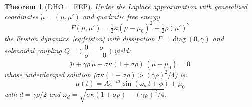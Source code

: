 \documentclass[11pt,a4paper]{article}
\newtheorem{theorem}{Theorem}
\begin{document}
\begin{theorem}[DHO = FEP]
\label{thm:wave-fep-equiv}
Under the Laplace approximation with generalized coordinates
$\tilde{\mu} = (\mu, \mu')$ and quadratic free energy
\begin{equation}
F(\mu, \mu') = \tfrac{1}{2}\kappa(\mu - \mu_0)^2
  + \tfrac{1}{2}\rho(\mu')^2
\end{equation}
the Friston dynamics~\eqref{eq:friston} with dissipation
$\Gamma = \operatorname{diag}(0, \gamma)$ and solenoidal coupling
$Q = \bigl(\begin{smallmatrix} 0 & -\sigma \\ \sigma & \phantom{-}0
\end{smallmatrix}\bigr)$ yield:
\begin{equation}
\label{eq:dho}
\ddot{\mu} + \gamma\rho\,\dot{\mu}
  + \sigma\kappa(1 + \sigma\rho)\,(\mu - \mu_0) = 0
\end{equation}
whose underdamped solution
($\sigma\kappa(1+\sigma\rho) > (\gamma\rho)^2/4$) is:
\begin{equation}
\label{eq:solution}
\mu(t) = A e^{-dt}\sin(\omega_d\, t + \phi) + \mu_0
\end{equation}
with $d = \gamma\rho/2$ and
$\omega_d = \sqrt{\sigma\kappa(1+\sigma\rho) - (\gamma\rho)^2/4}$.
\end{theorem}
\end{document}
